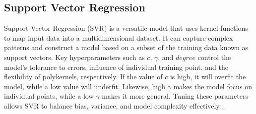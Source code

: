 \documentclass[conference]{IEEEtran}
\begin{document}
\subsection{Support Vector Regression}
Support Vector Regression (SVR) is a versatile model that uses kernel functions to map input data into a multidimensional dataset. It can capture complex patterns and construct a model based on a subset of the training data known as support vectors. Key hyperparameters such as $c$, $\gamma$, and $degree$ control the model's tolerance to errors, influence of individual training point, and the flexibility of polykernels, respectively. If the value of $c$ is high, it will overfit the model, while a low value will underfit. Likewise, high $\gamma$ makes the model focus on individual points, while a low $\gamma$ makes it more general. Tuning these parameters allows SVR to balance bias, variance, and model complexity effectively \cite{svrreg}. 
\end{document}
